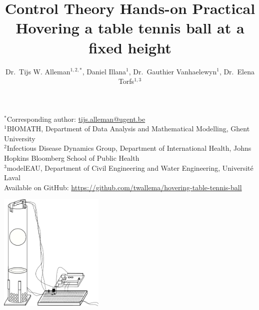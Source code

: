 \documentclass[10pt,twoside,openright]{article}
\begin{document}
\title{%
  Control Theory Hands-on Practical \\
  \Large Hovering a table tennis ball at a fixed height}
  
\author{Dr.~Tijs W. Alleman$^{1,2,*}$, Daniel Illana$^{1}$, Dr.~Gauthier Vanhaelewyn$^{1}$, Dr.~Elena Torfs$^{1,3}$}
\maketitle

$^*$Corresponding author: \url{tijs.alleman@ugent.be} \\
$^1$BIOMATH, Department of Data Analysis and Mathematical Modelling, Ghent University\\
$^2$Infectious Disease Dynamics Group, Department of International Health, Johns Hopkins Bloomberg School of Public Health\\
$^3$modelEAU, Department of Civil Engineering and Water Engineering, Universit\'e Laval\\
Available on GitHub: \url{https://github.com/twallema/hovering-table-tennis-ball}\\

\begin{center}
\includegraphics[width=5cm]{setup.pdf}
\end{center}
\end{document}
